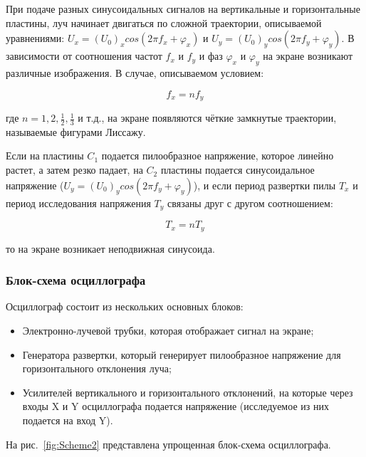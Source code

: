 При подаче разных синусоидальных сигналов на вертикальные и горизонтальные пластины, луч начинает двигаться по сложной траектории, описываемой уравнениями: $U_x = (U_0)_xcos(2{\pi}f_x + \varphi_x)$ и $U_y = (U_0)_ycos(2{\pi}f_y + \varphi_y)$. В зависимости от соотношения частот $f_x$ и $f_y$ и фаз $\varphi_x$ и $\varphi_y$ на экране возникают различные изображения. В случае, описываемом условием:

\begin{equation}
\label{eq:3}
   f_x = nf_y
\end{equation}

где $n = 1, 2, \frac{1}{2}, \frac{1}{3}$ и т.д., на экране появляются чёткие замкнутые траектории, называемые фигурами Лиссажу.

Если на пластины $C_1$ подается пилообразное напряжение, которое линейно растет, а затем резко падает, на $C_2$ пластины подается синусоидальное напряжение ($U_y = (U_0)_ycos(2{\pi}f_y + \varphi_y)$), и если период развертки пилы $T_x$ и период исследования напряжения $T_y$ связаны друг с другом соотношением:

\begin{equation}
\label{eq:4}
   T_x = nT_y
\end{equation}

то на экране возникает неподвижная синусоида.

\subsubsection{Блок-схема осциллографа}

Осциллограф состоит из нескольких основных блоков:

\begin{itemize}
\item Электронно-лучевой трубки, которая отображает сигнал на экране;
\item Генератора развертки, который генерирует пилообразное напряжение для горизонтального отклонения луча;
\item Усилителей вертикального и горизонтального отклонений, на которые через входы X и Y осциллографа подается напряжение (исследуемое из них подается на вход Y).
\end{itemize}

На рис.~\ref{fig:Scheme2} представлена упрощенная блок-схема осциллографа.

